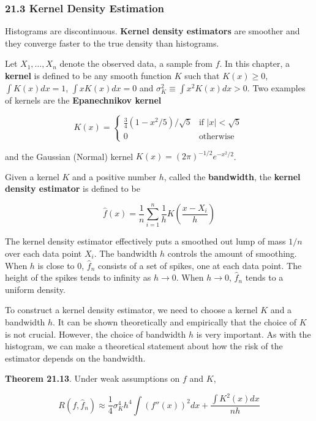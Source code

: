 \subsubsection{21.3 Kernel Density Estimation}\label{kernel-density-estimation}

Histograms are discontinuous. \textbf{Kernel density estimators} are
smoother and they converge faster to the true density than histograms.

Let \(X_1, \dots, X_n\) denote the observed data, a sample from \(f\).
In this chapter, a \textbf{kernel} is defined to be any smooth function
\(K\) such that \(K(x) \geq 0\), \(\int K(x) dx = 1\),
\(\int x K(x) dx = 0\) and \(\sigma_K^2 \equiv \int x^2 K(x) dx > 0\).
Two examples of kernels are the \textbf{Epanechnikov kernel}

\[ K(x) = \begin{cases}
\frac{3}{4} \left(1 - x^2 / 5 \right) / \sqrt{5} & \text{if } |x| < \sqrt{5} \\
0 & \text{otherwise}
\end{cases}\]

and the Gaussian (Normal) kernel \(K(x) = (2\pi)^{-1/2} e^{-x^2/2}\).

Given a kernel \(K\) and a positive number \(h\), called the
\textbf{bandwidth}, the \textbf{kernel density estimator} is defined to
be

\[ \hat{f}(x) = \frac{1}{n} \sum_{i=1}^n \frac{1}{h} K \left( \frac{x - X_i}{h} \right) \]

The kernel density estimator effectively puts a smoothed out lump of
mass \(1 / n\) over each data point \(X_i\). The bandwidth \(h\)
controls the amount of smoothing. When \(h\) is close to 0,
\(\hat{f}_n\) consists of a set of spikes, one at each data point. The
height of the spikes tends to infinity as \(h \rightarrow 0\). When
\(h \rightarrow 0\), \(\hat{f}_n\) tends to a uniform density.

To construct a kernel density estimator, we need to choose a kernel
\(K\) and a bandwidth \(h\). It can be shown theoretically and
empirically that the choice of \(K\) is not crucial. However, the choice
of bandwidth \(h\) is very important. As with the histogram, we can make
a theoretical statement about how the risk of the estimator depends on
the bandwidth.

\textbf{Theorem 21.13}. Under weak assumptions on \(f\) and \(K\),

\[ R(f, \hat{f}_n) \approx \frac{1}{4} \sigma_K^4 h^4 \int \left(f''(x)\right)^2 dx + \frac{\int K^2(x) dx}{nh} \]

